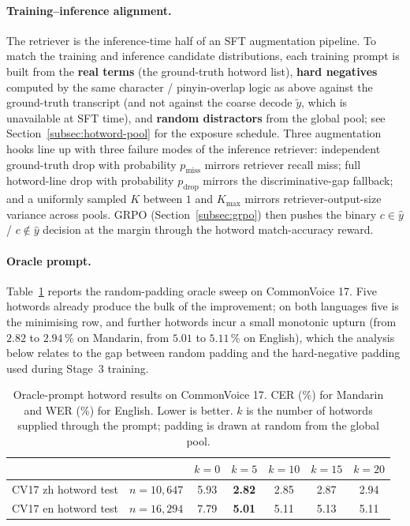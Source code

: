 \paragraph{Training--inference alignment.}
The retriever is the inference-time half of an SFT augmentation
pipeline. To match the training and inference candidate
distributions, each training prompt is built from the
\textbf{real terms} (the ground-truth hotword list), \textbf{hard
negatives} computed by the same character / pinyin-overlap logic
as above against the ground-truth transcript (and not against the
coarse decode $\tilde{y}$, which is unavailable at SFT time), and
\textbf{random distractors} from the global pool; see
Section~\ref{subsec:hotword-pool} for the exposure schedule. Three
augmentation hooks line up with three failure modes of the
inference retriever: independent ground-truth drop with
probability $p_\text{miss}$ mirrors retriever recall miss; full
hotword-line drop with probability $p_\text{drop}$ mirrors the
discriminative-gap fallback; and a uniformly sampled $K$ between
$1$ and $K_\text{max}$ mirrors retriever-output-size variance
across pools. GRPO (Section~\ref{subsec:grpo}) then pushes the
binary $c \in \hat{y}$ / $c \notin \hat{y}$ decision at the margin
through the hotword match-accuracy reward.

\paragraph{Oracle prompt.}
Table~\ref{tab:hotwords_oracle} reports the random-padding oracle
sweep on CommonVoice 17. Five hotwords already produce the bulk of
the improvement; on both languages five is the minimising row, and
further hotwords incur a small monotonic upturn (from $2.82$ to
$2.94$\,\% on Mandarin, from $5.01$ to $5.11$\,\% on English),
which the analysis below relates to the gap between random padding
and the hard-negative padding used during Stage~3 training.

\begin{table}[t]
  \caption{Oracle-prompt hotword results on CommonVoice 17. CER (\%)
    for Mandarin and WER (\%) for English. Lower is better. $k$ is
    the number of hotwords supplied through the prompt; padding is
    drawn at random from the global pool.}
  \label{tab:hotwords_oracle}
  \centering
  \small
  \begin{tabular}{lrccccc}
    \toprule
    & & $k=0$ & $k=5$ & $k=10$ & $k=15$ & $k=20$ \\
    \midrule
    CV17 zh hotword test  & $n=10{,}647$ & 5.93 & \textbf{2.82} & 2.85 & 2.87 & 2.94 \\
    CV17 en hotword test  & $n=16{,}294$ & 7.79 & \textbf{5.01} & 5.11          & 5.13 & 5.11 \\
    \bottomrule
  \end{tabular}
\end{table}


